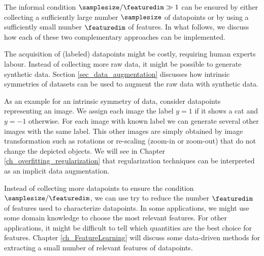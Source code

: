\documentclass[12pt]{report}
\newcommand{\featurelen}{\featuredim}
\begin{document}
The informal condition $\samplesize/\featurelen \gg 1$ can be ensured 
by either collecting a sufficiently large number $\samplesize$ of datapoints 
or by using a sufficiently small number $\featurelen$ of features. In what 
follows, we discuss how each of these two complementary approaches 
can be implemented. 

The acquisition of (labeled) datapoints might be costly, requiring human 
experts labour. Instead of collecting more raw data, it might 
be possible to generate synthetic data. Section \ref{sec_data_augmentation} 
discusses how intrinsic symmetries of datasets can be used to augment 
the raw data with synthetic data. 

As an example for an intrinsic symmetry of data, consider datapoints 
representing an image. We assign each image the label $y=1$ if it shows 
a cat and $y=-1$ otherwise. For each image with known label we can 
generate several other images with the same label. This other images 
are simply obtained by image transformation such as rotations or 
re-scaling (zoom-in or zoom-out) that do not change the depicted 
objects. We will see in Chapter \ref{ch_overfitting_regularization} 
that regularization techniques can be interpreted as an implicit 
data augmentation.  

Instead of collecting more datapoints to ensure the condition $\samplesize/\featurelen$, 
we can use try to reduce the number $\featurelen$ of features used to 
characterize datapoints. In some applications, we might use some domain 
knowledge to choose the most relevant features. For other applications, 
it might be difficult to tell which quantities are the best choice for features. 
Chapter \ref{ch_FeatureLearning} will discuss some data-driven methods 
for extracting a small number of relevant features of datapoints. 

\end{document}
